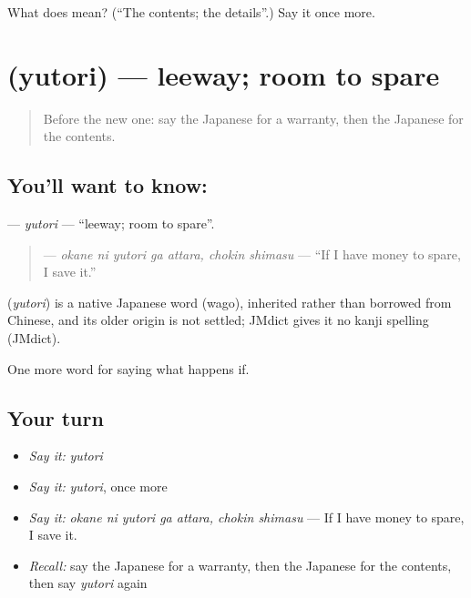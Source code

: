 \begin{tcolorbox}[breakable,colback=teal!4,colframe=teal!35!black,title={Before you move on}]
What does  mean? (\textquotedblleft{}The contents; the details\textquotedblright{}.) Say it once more.
\end{tcolorbox}
\section[\texorpdfstring{\ja{ゆとり} (yutori)}{ゆとり (yutori)}]{ (yutori) — leeway; room to spare}

\label{lesson:JA-C357-yutori}



\begin{quote}
Before the new one: say the Japanese for a warranty, then the Japanese for the contents.
\end{quote}

\subsection*{You'll want to know: }
\textbf{} — \emph{yutori} — \textquotedblleft{}leeway; room to spare\textquotedblright{}.

\begin{quote}
\textbf{  } — \emph{okane ni yutori ga attara, chokin shimasu} — \textquotedblleft{}If I have money to spare, I save it.\textquotedblright{}
\end{quote}

\begin{cousinweb}
\textbf{} (\emph{yutori}) is a native Japanese word (wago), inherited rather than borrowed from Chinese, and its older origin is not settled; JMdict gives it no kanji spelling (JMdict).
\end{cousinweb}

\begin{grammarlens}[title={What you've built}]
One more word for saying what happens if.
\end{grammarlens}

\subsection*{Your turn}
\begin{itemize}
\raggedright
  \item \emph{Say it:} \emph{yutori}
  \item \emph{Say it:} \emph{yutori}, once more
  \item \emph{Say it:} \emph{okane ni yutori ga attara, chokin shimasu} — If I have money to spare, I save it.
  \item \emph{Recall:} say the Japanese for a warranty, then the Japanese for the contents, then say \emph{yutori} again
\end{itemize}

